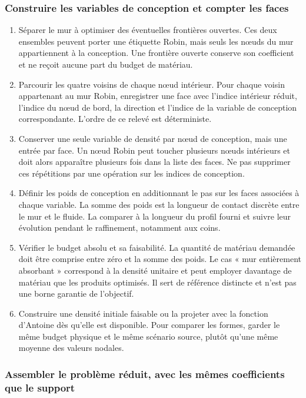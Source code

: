 \documentclass[11pt,a4paper]{article}
\begin{document}
\subsubsection{Construire les variables de conception et compter les faces}

\begin{enumerate}
\item Séparer le mur à optimiser des éventuelles frontières ouvertes. Ces deux ensembles peuvent porter une étiquette Robin, mais seuls les nœuds du mur appartiennent à la conception. Une frontière ouverte conserve son coefficient et ne reçoit aucune part du budget de matériau.
\item Parcourir les quatre voisins de chaque nœud intérieur. Pour chaque voisin appartenant au mur Robin, enregistrer une face avec l'indice intérieur réduit, l'indice du nœud de bord, la direction et l'indice de la variable de conception correspondante. L'ordre de ce relevé est déterministe.
\item Conserver une seule variable de densité par nœud de conception, mais une entrée par face. Un nœud Robin peut toucher plusieurs nœuds intérieurs et doit alors apparaître plusieurs fois dans la liste des faces. Ne pas supprimer ces répétitions par une opération sur les indices de conception.
\item Définir les poids de conception en additionnant le pas sur les faces associées à chaque variable. La somme des poids est la longueur de contact discrète entre le mur et le fluide. La comparer à la longueur du profil fourni et suivre leur évolution pendant le raffinement, notamment aux coins.
\item Vérifier le budget absolu et sa faisabilité. La quantité de matériau demandée doit être comprise entre zéro et la somme des poids. Le cas « mur entièrement absorbant » correspond à la densité unitaire et peut employer davantage de matériau que les produits optimisés. Il sert de référence distincte et n'est pas une borne garantie de l'objectif.
\item Construire une densité initiale faisable ou la projeter avec la fonction d'Antoine dès qu'elle est disponible. Pour comparer les formes, garder le même budget physique et le même scénario source, plutôt qu'une même moyenne des valeurs nodales.
\end{enumerate}

\subsubsection{Assembler le problème réduit, avec les mêmes coefficients que le support}
\end{document}
